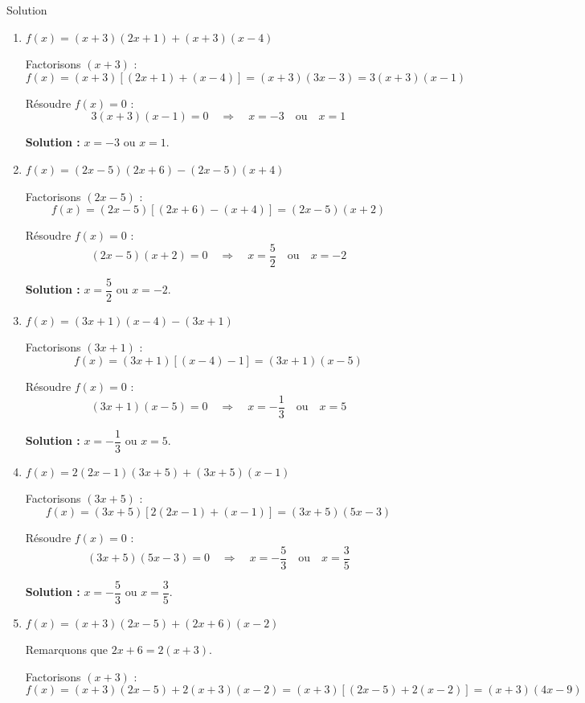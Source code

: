 \documentclass[a4paper,12pt]{article}
\begin{document}
\begin{solutionbox}{Solution}
\begin{enumerate}
    \textbf{Solution :} \( x = 0 \) ou \( x = 8 \).

    \item \( f(x) = (x + 3)(2x + 1) + (x + 3)(x - 4) \)

    Factorisons \( (x + 3) \) :
    \[
    f(x) = (x + 3)[(2x + 1) + (x - 4)] = (x + 3)(3x - 3) = 3(x + 3)(x - 1)
    \]

    Résoudre \( f(x) = 0 \) :
    \[
    3(x + 3)(x - 1) = 0 \quad \Rightarrow \quad x = -3 \quad \text{ou} \quad x = 1
    \]

    \textbf{Solution :} \( x = -3 \) ou \( x = 1 \).

    \item \( f(x) = (2x - 5)(2x + 6) - (2x - 5)(x + 4) \)

    Factorisons \( (2x - 5) \) :
    \[
    f(x) = (2x - 5)[(2x + 6) - (x + 4)] = (2x - 5)(x + 2)
    \]

    Résoudre \( f(x) = 0 \) :
    \[
    (2x - 5)(x + 2) = 0 \quad \Rightarrow \quad x = \dfrac{5}{2} \quad \text{ou} \quad x = -2
    \]

    \textbf{Solution :} \( x = \dfrac{5}{2} \) ou \( x = -2 \).

    \item \( f(x) = (3x + 1)(x - 4) - (3x + 1) \)

    Factorisons \( (3x + 1) \) :
    \[
    f(x) = (3x + 1)[(x - 4) - 1] = (3x + 1)(x - 5)
    \]

    Résoudre \( f(x) = 0 \) :
    \[
    (3x + 1)(x - 5) = 0 \quad \Rightarrow \quad x = -\dfrac{1}{3} \quad \text{ou} \quad x = 5
    \]

    \textbf{Solution :} \( x = -\dfrac{1}{3} \) ou \( x = 5 \).

    \item \( f(x) = 2(2x - 1)(3x + 5) + (3x + 5)(x - 1) \)

    Factorisons \( (3x + 5) \) :
    \[
    f(x) = (3x + 5)[2(2x - 1) + (x - 1)] = (3x + 5)(5x - 3)
    \]

    Résoudre \( f(x) = 0 \) :
    \[
    (3x + 5)(5x - 3) = 0 \quad \Rightarrow \quad x = -\dfrac{5}{3} \quad \text{ou} \quad x = \dfrac{3}{5}
    \]

    \textbf{Solution :} \( x = -\dfrac{5}{3} \) ou \( x = \dfrac{3}{5} \).

    \item \( f(x) = (x + 3)(2x - 5) + (2x + 6)(x - 2) \)

    Remarquons que \( 2x + 6 = 2(x + 3) \).

    Factorisons \( (x + 3) \) :
    \[
    f(x) = (x + 3)(2x - 5) + 2(x + 3)(x - 2) = (x + 3)[(2x - 5) + 2(x - 2)] = (x + 3)(4x - 9)
    \]


\end{enumerate}
\end{solutionbox}
\end{document}
